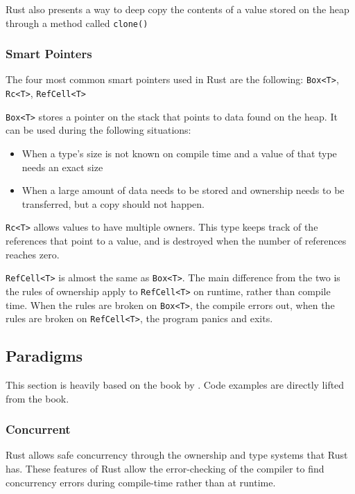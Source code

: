 \documentclass{article}
\newcommand{\rustin}[1]{\texttt{#1}}
\begin{document}
  Rust also presents a way to deep copy the contents of a value stored on the
  heap through a method called \rustin{clone()}

  \subsubsection{Smart Pointers}
  The four most common smart pointers used in Rust are the following:
  \rustin{Box<T>}, \rustin{Rc<T>}, \rustin{RefCell<T>}

  \rustin{Box<T>} stores a pointer on the stack that points to data found on the
  heap. It can be used during the following situations:
  \begin{itemize}
    \item When a type's size is not known on compile time and a value of that
          type needs an exact size
    \item When a large amount of data needs to be stored and ownership needs to
          be transferred, but a copy should not happen.
  \end{itemize}

  \rustin{Rc<T>} allows values to have multiple owners. This type keeps track of
  the references that point to a value, and is destroyed when the number of
  references reaches zero.

  \rustin{RefCell<T>} is almost the same as \rustin{Box<T>}. The main difference
  from the two is the rules of ownership apply to \rustin{RefCell<T>} on
  runtime, rather than compile time. When the rules are broken on
  \rustin{Box<T>}, the compile errors out, when the rules are broken on
  \rustin{RefCell<T>}, the program panics and exits.

  \subsection{Paradigms}

  This section is heavily based on the book  by
  \cite{klabnik_nichols_2018}. Code examples are directly lifted from the book.

  \subsubsection{Concurrent}
  Rust allows safe concurrency through the ownership and type systems that Rust
  has. These features of Rust allow the error-checking of the compiler to find
  concurrency errors during compile-time rather than at runtime.
\end{document}
